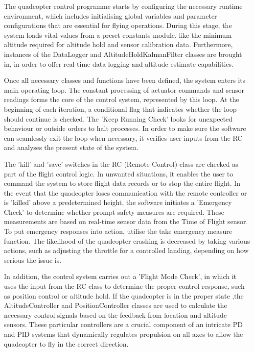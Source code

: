 \documentclass{report}
\begin{document}
The quadcopter control programme starts by configuring the necessary runtime
environment, which includes initialising global variables and parameter
configurations that are essential for flying operations. During this stage, the
system loads vital values from a preset constants module, like the minimum
altitude required for altitude hold and sensor calibration data. Furthermore,
instances of the DataLogger and AltitudeHoldKalmanFilter classes are brought
in, in order to offer real-time data logging and altitude estimate
capabilities.

Once all necessary classes and functions have been defined, the system enters
its main operating loop. The constant processing of actuator commands and sensor
readings forms the core of the control system, represented by this loop. At the
beginning of each iteration, a conditional flag that indicates whether the loop
should continue is checked. The 'Keep Running Check' looks for unexpected
behaviour or outside orders to halt processes. In order to make sure the
software can seamlessly exit the loop when necessary, it verifies user inputs
from the RC and analyses the present state of the system.

The 'kill' and 'save' switches in the RC (Remote Control) class are checked as
part of the flight control logic. In unwanted situations, it enables the user to
command the system to store flight data records or to stop the entire flight. In
the event that the quadcopter loses communication with the remote controller or
is 'killed' above a predetermined height, the software initiates a 'Emergency
Check' to determine whether prompt safety measures are required. These
measurements are based on real-time sensor data from the Time of Flight sensor.
To put emergency responses into action, utilise the take emergency measure
function. The likelihood of the quadcopter crashing is decreased by taking
various actions, such as adjusting the throttle for a controlled landing,
depending on how serious the issue is.

In addition, the control system carries out a 'Flight Mode Check', in which it
uses the input from the RC class to determine the proper control response, such
as position control or altitude hold. If the quadcopter is in the proper state ,the
AltitudeController and PositionController classes are used to calculate the
necessary control signals based on the feedback from location and altitude
sensors. These particular controllers are a crucial component of an intricate PD
and PID systems that dynamically regulates propulsion on all axes to allow the
quadcopter to fly in the correct direction.
\end{document}
